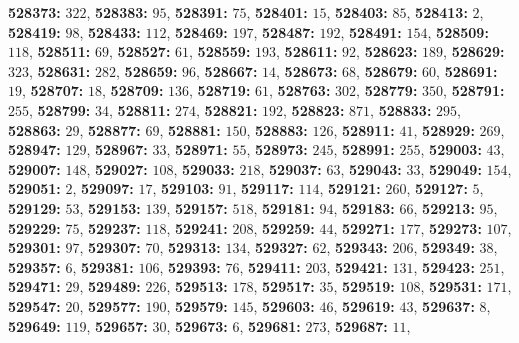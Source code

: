 \textsf{\bfseries 528373:} $322$, \textsf{\bfseries 528383:} $95$, \textsf{\bfseries 528391:} $75$, \textsf{\bfseries 528401:} $15$, \textsf{\bfseries 528403:} $85$, \textsf{\bfseries 528413:} $2$, \textsf{\bfseries 528419:} $98$, \textsf{\bfseries 528433:} $112$, \textsf{\bfseries 528469:} $197$, \textsf{\bfseries 528487:} $192$, \textsf{\bfseries 528491:} $154$, \textsf{\bfseries 528509:} $118$, \textsf{\bfseries 528511:} $69$, \textsf{\bfseries 528527:} $61$, \textsf{\bfseries 528559:} $193$, \textsf{\bfseries 528611:} $92$, \textsf{\bfseries 528623:} $189$, \textsf{\bfseries 528629:} $323$, \textsf{\bfseries 528631:} $282$, \textsf{\bfseries 528659:} $96$, \textsf{\bfseries 528667:} $14$, \textsf{\bfseries 528673:} $68$, \textsf{\bfseries 528679:} $60$, \textsf{\bfseries 528691:} $19$, \textsf{\bfseries 528707:} $18$, \textsf{\bfseries 528709:} $136$, \textsf{\bfseries 528719:} $61$, \textsf{\bfseries 528763:} $302$, \textsf{\bfseries 528779:} $350$, \textsf{\bfseries 528791:} $255$, \textsf{\bfseries 528799:} $34$, \textsf{\bfseries 528811:} $274$, \textsf{\bfseries 528821:} $192$, \textsf{\bfseries 528823:} $871$, \textsf{\bfseries 528833:} $295$, \textsf{\bfseries 528863:} $29$, \textsf{\bfseries 528877:} $69$, \textsf{\bfseries 528881:} $150$, \textsf{\bfseries 528883:} $126$, \textsf{\bfseries 528911:} $41$, \textsf{\bfseries 528929:} $269$, \textsf{\bfseries 528947:} $129$, \textsf{\bfseries 528967:} $33$, \textsf{\bfseries 528971:} $55$, \textsf{\bfseries 528973:} $245$, \textsf{\bfseries 528991:} $255$, \textsf{\bfseries 529003:} $43$, \textsf{\bfseries 529007:} $148$, \textsf{\bfseries 529027:} $108$, \textsf{\bfseries 529033:} $218$, \textsf{\bfseries 529037:} $63$, \textsf{\bfseries 529043:} $33$, \textsf{\bfseries 529049:} $154$, \textsf{\bfseries 529051:} $2$, \textsf{\bfseries 529097:} $17$, \textsf{\bfseries 529103:} $91$, \textsf{\bfseries 529117:} $114$, \textsf{\bfseries 529121:} $260$, \textsf{\bfseries 529127:} $5$, \textsf{\bfseries 529129:} $53$, \textsf{\bfseries 529153:} $139$, \textsf{\bfseries 529157:} $518$, \textsf{\bfseries 529181:} $94$, \textsf{\bfseries 529183:} $66$, \textsf{\bfseries 529213:} $95$, \textsf{\bfseries 529229:} $75$, \textsf{\bfseries 529237:} $118$, \textsf{\bfseries 529241:} $208$, \textsf{\bfseries 529259:} $44$, \textsf{\bfseries 529271:} $177$, \textsf{\bfseries 529273:} $107$, \textsf{\bfseries 529301:} $97$, \textsf{\bfseries 529307:} $70$, \textsf{\bfseries 529313:} $134$, \textsf{\bfseries 529327:} $62$, \textsf{\bfseries 529343:} $206$, \textsf{\bfseries 529349:} $38$, \textsf{\bfseries 529357:} $6$, \textsf{\bfseries 529381:} $106$, \textsf{\bfseries 529393:} $76$, \textsf{\bfseries 529411:} $203$, \textsf{\bfseries 529421:} $131$, \textsf{\bfseries 529423:} $251$, \textsf{\bfseries 529471:} $29$, \textsf{\bfseries 529489:} $226$, \textsf{\bfseries 529513:} $178$, \textsf{\bfseries 529517:} $35$, \textsf{\bfseries 529519:} $108$, \textsf{\bfseries 529531:} $171$, \textsf{\bfseries 529547:} $20$, \textsf{\bfseries 529577:} $190$, \textsf{\bfseries 529579:} $145$, \textsf{\bfseries 529603:} $46$, \textsf{\bfseries 529619:} $43$, \textsf{\bfseries 529637:} $8$, \textsf{\bfseries 529649:} $119$, \textsf{\bfseries 529657:} $30$, \textsf{\bfseries 529673:} $6$, \textsf{\bfseries 529681:} $273$, \textsf{\bfseries 529687:} $11$, 
